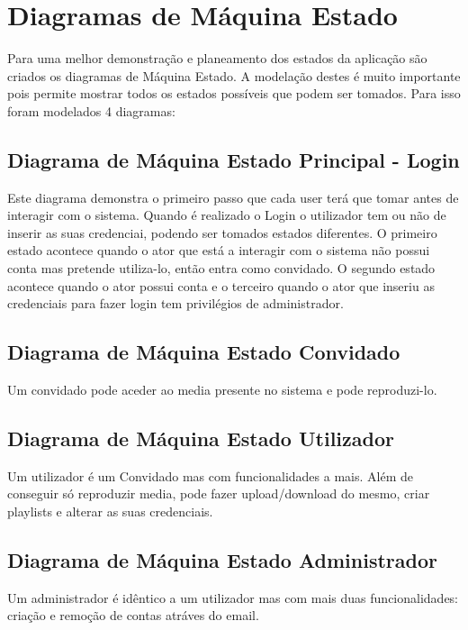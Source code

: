 \documentclass[a4paper]{report}
\begin{document}
\chapter{Diagramas de Máquina Estado}

Para uma melhor demonstração e planeamento dos estados da aplicação são criados os
diagramas de Máquina Estado. A modelação destes é muito importante pois permite
mostrar todos os estados possíveis que podem ser tomados. Para isso foram modelados
4 diagramas:

\section{Diagrama de Máquina Estado Principal - Login}

Este diagrama demonstra o primeiro passo que cada user terá que tomar antes de 
interagir com o sistema. Quando é realizado o Login o utilizador tem ou não de 
inserir as suas credenciai, podendo ser tomados estados
diferentes. O primeiro estado acontece quando o ator que está a interagir
com o sistema não possui conta mas pretende utiliza-lo, então entra como
convidado. O segundo estado acontece quando o ator possui conta e o terceiro
quando o ator que inseriu as credenciais para fazer login tem privilégios de 
administrador.

\section{Diagrama de Máquina Estado Convidado}

Um convidado pode aceder ao media presente no sistema e pode reproduzi-lo.

\section{Diagrama de Máquina Estado Utilizador}

Um utilizador é um Convidado mas com funcionalidades a mais. Além
de conseguir só reproduzir media, pode fazer upload/download do mesmo, criar
playlists e alterar as suas credenciais.

\section{Diagrama de Máquina Estado Administrador}

Um administrador é idêntico a um utilizador mas com mais duas funcionalidades:
criação e remoção de contas atráves do email.
\end{document}
